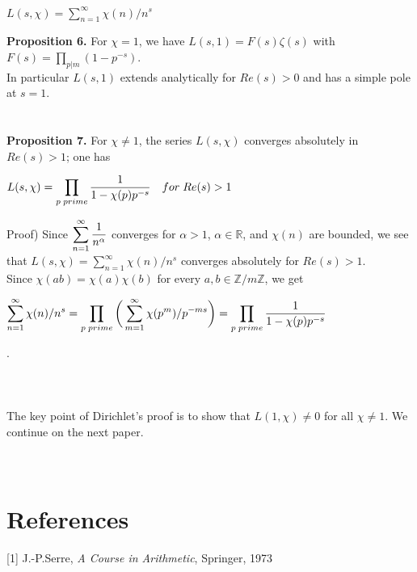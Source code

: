 \documentclass[11pt]{article}
\begin{document}
\begin{center}
    $L(s,\chi)=\displaystyle\sum_{n=1}^{\infty} \chi(n)/n^s$
\end{center}
\textbf{Proposition 6.}
For $\chi=1$, we have $L(s,1)=F(s)\zeta(s)$ with $F(s)=\displaystyle\prod_{p|m} (1-p^{-s})$. \\ In particular $L(s,1)$ extends analytically for $Re(s)>0$ and has a simple pole at $s=1$.
\\
\\
\\
\textbf{Proposition 7.}
For $\chi\neq 1$, the series $L(s,\chi)$ converges absolutely in $Re(s)>1$; one has
\begin{center}
    $L(s,\chi)=\displaystyle\prod_{p \; prime} {1\over 1-\chi(p)p^{-s}} \quad for \; Re(s)>1$
\end{center}
Proof) Since $\displaystyle\sum_{n=1}^{\infty} {1\over n^\alpha}$ converges for $\alpha>1$, $\alpha\in\mathbb{R}$, and $\chi(n)$ are bounded, we see that $L(s,\chi)=\displaystyle\sum_{n=1}^{\infty} \chi(n)/n^s$ converges absolutely for $Re(s)>1$.
\\ Since $\chi(ab)=\chi(a)\chi(b)$ for every $a,b\in \mathbb{Z}/m\mathbb{Z}$, we get
\begin{center}
   $\displaystyle\sum_{n=1}^{\infty} \chi(n)/n^s=\displaystyle\prod_{p \; prime}\bigg(\displaystyle\sum_{m=1}^{\infty} \chi(p^m)/p^{-ms}\bigg)=\displaystyle\prod_{p \; prime} {1\over 1-\chi(p)p^{-s}}$
\end{center}.
\\
\\
\\
\\
The key point of Dirichlet's proof is to show that $L(1,\chi)\neq 0$ for all $\chi\neq 1$. We continue on the next paper.
\\
\\
\\
\section*{References}
[1] J.-P.Serre, \textit{A Course in Arithmetic}, Springer, 1973
\end{document}
